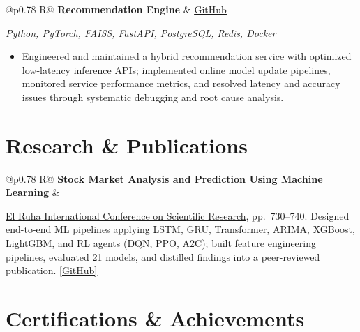 \documentclass[a4paper,10pt]{article}
\newcommand{\ulink}[2]{\href{#1}{\uline{#2}}}
\newcommand{\subheading}[1]{{\color[HTML]{0A0A0A}\fontsize{12}{14}\selectfont\bfseries #1}}
\newcommand{\techstack}[1]{{\color[HTML]{5C5C5C}\fontsize{10.5}{12.5}\selectfont\itshape #1}}
\newcommand{\meta}[1]{{\color[HTML]{5C5C5C}\fontsize{10.5}{12.5}\selectfont #1}}
\begin{document}
\begin{tabularx}{\linewidth}{@{}p{0.78\linewidth} R@{}}
\subheading{Recommendation Engine} & \meta{\ulink{https://github.com/su-jin1425/Recommendation-Engine}{GitHub}}
\end{tabularx}
\vspace{1pt}
\techstack{Python, PyTorch, FAISS, FastAPI, PostgreSQL, Redis, Docker}
\begin{itemize}[nosep, leftmargin=1.5em, itemsep=1pt, topsep=2pt]
\item {\color[HTML]{0A0A0A}\fontsize{11}{14}\selectfont
Engineered and maintained a hybrid recommendation service with optimized low-latency inference APIs; implemented online model update pipelines, monitored service performance metrics, and resolved latency and accuracy issues through systematic debugging and root cause analysis.}
\end{itemize}

\vspace{2pt}

\section{Research \& Publications}
\vspace{2pt}

\begin{tabularx}{\linewidth}{@{}p{0.78\linewidth} R@{}}
\subheading{Stock Market Analysis and Prediction Using Machine Learning} & \meta{2025}
\end{tabularx}
\vspace{1pt}
{\color[HTML]{0A0A0A}\fontsize{11}{14}\selectfont
\ulink{https://www.elruha.org/_files/ugd/614b1f_6b95e1b697bf452b9907ba46e0151c05.pdf\#page=774}{El Ruha International Conference on Scientific Research}, pp.\ 730--740. Designed end-to-end ML pipelines applying LSTM, GRU, Transformer, ARIMA, XGBoost, LightGBM, and RL agents (DQN, PPO, A2C); built feature engineering pipelines, evaluated 21 models, and distilled findings into a peer-reviewed publication. \ulink{https://github.com/su-jin1425/Set-Project}{[GitHub]}}

\vspace{2pt}

\section{Certifications \& Achievements}
\vspace{2pt}
\end{document}
